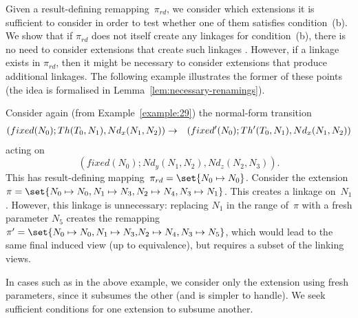 Given a result-defining remapping~$\pi_{rd}$, we consider which extensions it
is sufficient to consider in order to test whether one of them satisfies
condition~(b).  We show that if $\pi_{rd}$ does not itself create any linkages
for condition~(b), there is no need to consider extensions that create such
linkages .  However, if a linkage exists in $\pi_{rd}$, then it might be
necessary to consider extensions that produce additional linkages.
%
The following example illustrates the former of these points (the idea is
formalised in Lemma~\ref{lem:necessary-renamings}).
\begin{example}
\label{example:singleRef:unnecessary-linkage}
Consider again (from Example~\ref{example:29}) the normal-form transition
\begin{eqnarray*}
(fixed(N_0); Th(T_0,N_1), Nd_x(N_1,N_2)) & \stackrel{}\rightarrow &
  (fixed'(N_0); Th'(T_0,N_1), Nd_x(N_1,N_2))
\end{eqnarray*}
acting on 
\[
(fixed(N_0); Nd_y(N_1,N_2), Nd_z(N_2,N_3)).
\]
This has result-defining mapping~$\pi_{rd} = \set{N_0 \mapsto N_0}$.  Consider
the extension $\pi = \set{{N_0 \mapsto N_0},\linebreak[1] N_1 \mapsto N_3,
N_2 \mapsto N_4,\linebreak[1] {N_3 \mapsto N_1}}$.  This creates a linkage
on~$N_1$.  However, this linkage is unnecessary: replacing $N_1$ in the range
of~$\pi$ with a fresh parameter $N_5$ creates the remapping $\pi'
= \set{N_0 \mapsto N_0,\linebreak[1] {N_1 \mapsto N_3,} N_2 \mapsto
N_4,\linebreak[1] {N_3 \mapsto N_5}}$, which would lead to the same final
induced view (up to equivalence), but requires a subset of the linking views.
\end{example}

In cases such as in the above example, we consider only the extension using
fresh parameters, since it subsumes the other (and is simpler to handle).  We
seek sufficient conditions for one extension to subsume another. 


